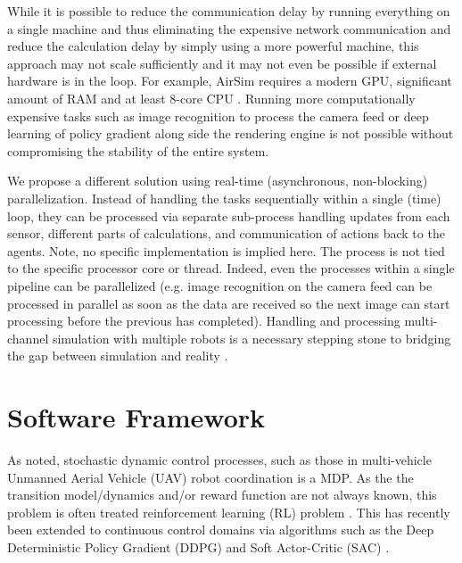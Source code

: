 \documentclass{article}
\let\cite\citep
\begin{document}
While it is possible to reduce the communication delay by running everything on a single machine and thus eliminating the expensive network communication and reduce the calculation delay by simply using a more powerful machine, this approach may not scale sufficiently and it may not even be possible if external hardware is in the loop.   For example, AirSim requires a modern GPU, significant amount of RAM and at least 8-core CPU \cite{shah2018airsim}. Running more computationally expensive tasks such as image recognition to process the camera feed or deep learning of policy gradient along side the rendering engine is not possible without compromising the stability of the entire system.

We propose a different solution using real-time (asynchronous, non-blocking) parallelization. Instead of handling the tasks sequentially within a single (time) loop, they can be processed via separate sub-process  %
handling updates from each sensor, different parts of calculations, and communication of actions back to the agents.
Note, no specific implementation is implied here. The process is not tied to the specific processor core or thread.
Indeed, even the processes within a single pipeline can be parallelized (e.g. image recognition on the camera feed can be processed in parallel as soon as the data are received so the next image can start processing before the previous has completed).
Handling and processing multi-channel simulation with multiple robots is a necessary stepping stone to bridging the gap between simulation and reality \cite{loquercio2019deep, james2019sim}. %



\section{Software Framework}

As noted, stochastic dynamic control processes, such as those in multi-vehicle Unmanned Aerial Vehicle (UAV) robot coordination is a MDP.   As the the transition model/dynamics and/or reward function are not always known, this problem is often treated reinforcement learning (RL) problem \cite{sutton2018reinforcement}.  This has recently been extended to continuous control domains  \cite{henderson2018deep} via algorithms such as the Deep Deterministic Policy Gradient (DDPG) \cite{DDPG} and Soft Actor-Critic (SAC) \cite{SAC}.
\end{document}

